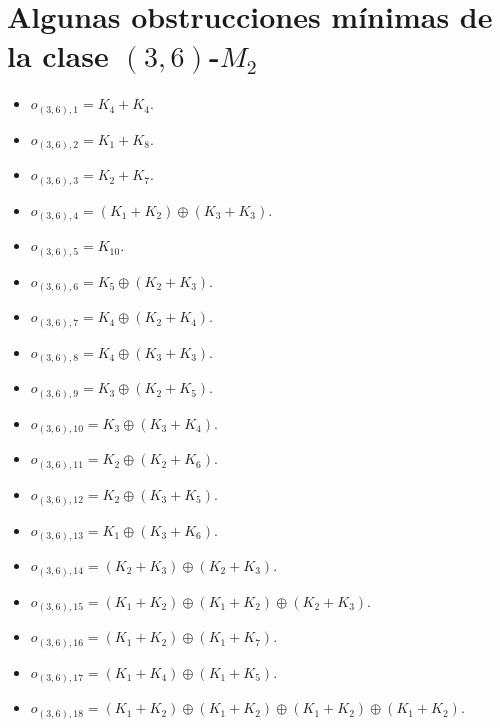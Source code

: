 \section{Algunas obstrucciones mínimas de la clase $(3,6)$-$M_2$}
\begin{itemize}
    \item $o_{(3,6),1} = K_4+K_4$.
    \item $o_{(3,6),2} = K_1+K_8$.
    \item $o_{(3,6),3} = K_2+K_7$.
    \item $o_{(3,6),4} = (K_1+K_2)\oplus(K_3+K_3)$.
    \item $o_{(3,6),5} = K_{10}$.
    \item $o_{(3,6),6} = K_5\oplus(K_2+K_3)$.
    \item $o_{(3,6),7} = K_4\oplus(K_2+K_4)$.
    \item $o_{(3,6),8} = K_4\oplus(K_3+K_3)$.
    \item $o_{(3,6),9} = K_3\oplus(K_2+K_5)$.
    \item $o_{(3,6),10} = K_3\oplus(K_3+K_4)$.
    \item $o_{(3,6),11} = K_2\oplus(K_2+K_6)$.
    \item $o_{(3,6),12} = K_2\oplus(K_3+K_5)$.
    \item $o_{(3,6),13} = K_1\oplus(K_3+K_6)$.
    \item $o_{(3,6),14} = (K_2+K_3)\oplus(K_2+K_3)$.
    \item $o_{(3,6),15} = (K_1+K_2)\oplus(K_1+K_2)\oplus(K_2+K_3)$.
    \item $o_{(3,6),16} = (K_1+K_2)\oplus(K_1+K_7)$.
    \item $o_{(3,6),17} = (K_1+K_4)\oplus(K_1+K_5)$.
    \item $o_{(3,6),18} = (K_1+K_2)\oplus(K_1+K_2)\oplus(K_1+K_2)\oplus(K_1+K_2)$.
\end{itemize}

